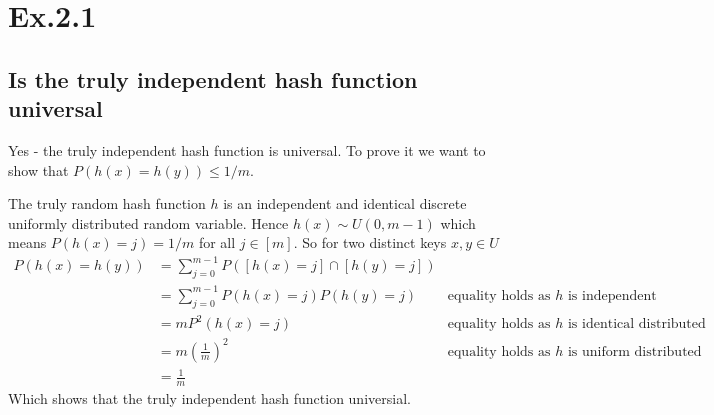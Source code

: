\section*{Ex.2.1}
\subsection*{Is the truly independent hash function universal}

Yes - the truly independent hash function is universal. 
To prove it we want to show that $P(h(x) = h(y))\leq 1/m$. 

The truly random hash function $h$ is an independent and identical discrete uniformly distributed random variable. 
Hence $h(x)\sim U(0,m-1)$ which means $P(h(x) = j) = 1/m$ for all $j\in[m]$. So for two distinct keys $x,y \in U$
\begin{align*}
P(h(x) = h(y)) &= \sum_{j=0}^{m-1} P([h(x)=j] \cap [h(y)=j])&\\
               &= \sum_{j=0}^{m-1}   P(h(x)=j) P(h(y)=j)    &\text{equality holds as $h$ is independent}\\
							 &= m P^2(h(x)=j)                             &\text{equality holds as $h$ is identical distributed}\\
							 &= m \left(\frac{1}{m}\right)^2              &\text{equality holds as $h$ is uniform distributed}\\
							 &= \frac{1}{m}                               &
\end{align*}
Which shows that the truly independent hash function universial.